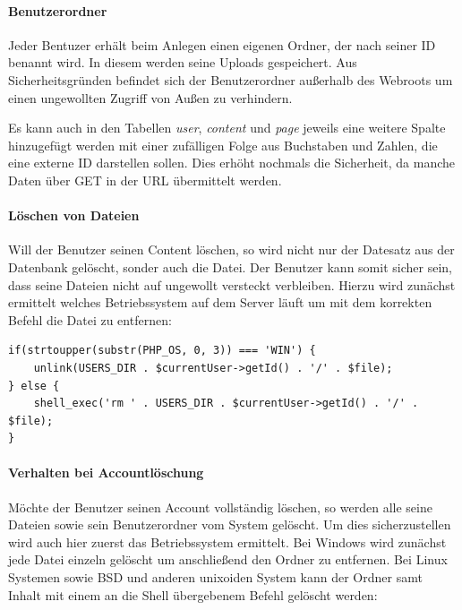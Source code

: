 \documentclass[10.5pt]{scrarticle}
\begin{document}
\paragraph{Benutzerordner}

Jeder Bentuzer erhält beim Anlegen einen eigenen Ordner, der nach seiner ID benannt wird. In diesem werden seine Uploads gespeichert. Aus Sicherheitsgründen befindet sich der Benutzerordner au{\ss}erhalb des Webroots um einen ungewollten Zugriff von Au{\ss}en zu verhindern.

\begin{infobox}[Alternative:]
Es kann auch in den Tabellen \textit{user}, \textit{content} und \textit{page} jeweils eine weitere Spalte hinzugefügt werden mit einer zufälligen Folge aus Buchstaben und Zahlen, die eine externe ID darstellen sollen. Dies erhöht nochmals die Sicherheit, da manche Daten über GET in der URL übermittelt werden.
\end{infobox}

\paragraph{Löschen von Dateien}
Will der Benutzer seinen Content löschen, so wird nicht nur der Datesatz aus der Datenbank gelöscht, sonder auch die Datei. Der Benutzer kann somit sicher sein, dass seine Dateien nicht auf ungewollt versteckt verbleiben. Hierzu wird zunächst ermittelt welches Betriebssystem auf dem Server läuft um mit dem korrekten Befehl die Datei zu entfernen:

\lstset{firstnumber=53}
\begin{lstlisting}
if(strtoupper(substr(PHP_OS, 0, 3)) === 'WIN') {
    unlink(USERS_DIR . $currentUser->getId() . '/' . $file);
} else {
    shell_exec('rm ' . USERS_DIR . $currentUser->getId() . '/' . $file);
}
\end{lstlisting}

\paragraph{Verhalten bei Accountlöschung}
Möchte der Benutzer seinen Account vollständig löschen, so werden alle seine Dateien sowie sein Benutzerordner vom System gelöscht. Um dies sicherzustellen wird auch hier zuerst das Betriebssystem ermittelt. Bei Windows wird zunächst jede Datei einzeln gelöscht um anschlie{\ss}end den Ordner zu entfernen. Bei Linux Systemen sowie BSD und anderen unixoiden System kann der Ordner samt Inhalt mit einem an die Shell übergebenem Befehl gelöscht werden:
\end{document}
